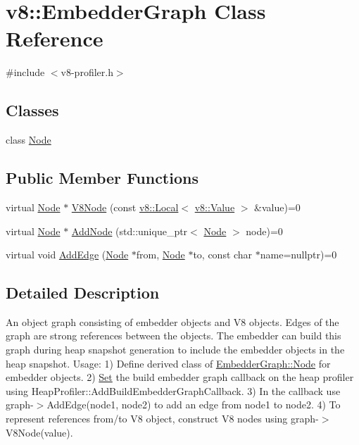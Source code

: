 \hypertarget{classv8_1_1EmbedderGraph}{}\section{v8\+:\+:Embedder\+Graph Class Reference}
\label{classv8_1_1EmbedderGraph}


{\ttfamily \#include $<$v8-\/profiler.\+h$>$}

\subsection*{Classes}
\begin{DoxyCompactItemize}
\item 
class \mbox{\hyperlink{classv8_1_1EmbedderGraph_1_1Node}{Node}}
\end{DoxyCompactItemize}
\subsection*{Public Member Functions}
\begin{DoxyCompactItemize}
\item 
virtual \mbox{\hyperlink{classv8_1_1EmbedderGraph_1_1Node}{Node}} $\ast$ \mbox{\hyperlink{classv8_1_1EmbedderGraph_a6fdb5451611738dd44c70d195445d0ff}{V8\+Node}} (const \mbox{\hyperlink{classv8_1_1Local}{v8\+::\+Local}}$<$ \mbox{\hyperlink{classv8_1_1Value}{v8\+::\+Value}} $>$ \&value)=0
\item 
virtual \mbox{\hyperlink{classv8_1_1EmbedderGraph_1_1Node}{Node}} $\ast$ \mbox{\hyperlink{classv8_1_1EmbedderGraph_a57afbce6126e5cd82b66f66b018a18e2}{Add\+Node}} (std\+::unique\+\_\+ptr$<$ \mbox{\hyperlink{classv8_1_1EmbedderGraph_1_1Node}{Node}} $>$ node)=0
\item 
virtual void \mbox{\hyperlink{classv8_1_1EmbedderGraph_a81b1c7dd4d0387ec50037b0778b8af11}{Add\+Edge}} (\mbox{\hyperlink{classv8_1_1EmbedderGraph_1_1Node}{Node}} $\ast$from, \mbox{\hyperlink{classv8_1_1EmbedderGraph_1_1Node}{Node}} $\ast$to, const char $\ast$name=nullptr)=0
\end{DoxyCompactItemize}


\subsection{Detailed Description}
An object graph consisting of embedder objects and V8 objects. Edges of the graph are strong references between the objects. The embedder can build this graph during heap snapshot generation to include the embedder objects in the heap snapshot. Usage\+: 1) Define derived class of \mbox{\hyperlink{classv8_1_1EmbedderGraph_1_1Node}{Embedder\+Graph\+::\+Node}} for embedder objects. 2) \mbox{\hyperlink{classv8_1_1Set}{Set}} the build embedder graph callback on the heap profiler using Heap\+Profiler\+::\+Add\+Build\+Embedder\+Graph\+Callback. 3) In the callback use graph-\/$>$Add\+Edge(node1, node2) to add an edge from node1 to node2. 4) To represent references from/to V8 object, construct V8 nodes using graph-\/$>$V8\+Node(value). 


